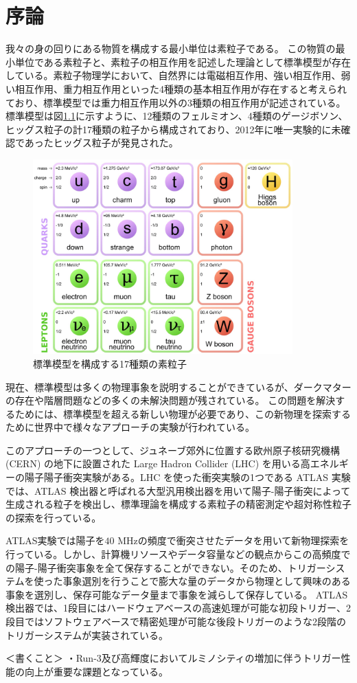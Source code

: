 \chapter{序論}
我々の身の回りにある物質を構成する最小単位は素粒子である。
この物質の最小単位である素粒子と、素粒子の相互作用を記述した理論として標準模型が存在している。素粒子物理学において、自然界には電磁相互作用、強い相互作用、弱い相互作用、重力相互作用といった4種類の基本相互作用が存在すると考えられており、標準模型では重力相互作用以外の3種類の相互作用が記述されている。
標準模型は図\ref{fig:標準模型}に示すように、12種類のフェルミオン、4種類のゲージボソン、ヒッグス粒子の計17種類の粒子から構成されており、2012年に唯一実験的に未確認であったヒッグス粒子が発見された。
\begin{figure}[tb]
  \centering
  \includegraphics[clip, width=10cm]{fig/1/standardmodel.jpg}
  \caption{標準模型を構成する17種類の素粒子}
  \label{fig:標準模型}
\end{figure}

現在、標準模型は多くの物理事象を説明することができているが、ダークマターの存在や階層問題などの多くの未解決問題が残されている。
この問題を解決するためには、標準模型を超える新しい物理が必要であり、この新物理を探索するために世界中で様々なアプローチの実験が行われている。

このアプローチの一つとして、ジュネーブ郊外に位置する欧州原子核研究機構 (CERN) の地下に設置された Large Hadron Collider (LHC) を用いる高エネルギーの陽子陽子衝突実験がある。LHC を使った衝突実験の1つである ATLAS 実験では、ATLAS 検出器と呼ばれる大型汎用検出器を用いて陽子-陽子衝突によって生成される粒子を検出し、標準理論を構成する素粒子の精密測定や超対称性粒子の探索を行っている。

ATLAS実験では陽子を$40$ MHzの頻度で衝突させたデータを用いて新物理探索を行っている。しかし、計算機リソースやデータ容量などの観点からこの高頻度での陽子-陽子衝突事象を全て保存することができない。そのため、トリガーシステムを使った事象選別を行うことで膨大な量のデータから物理として興味のある事象を選別し、保存可能なデータ量まで事象を減らして保存している。
ATLAS検出器では、1段目にはハードウェアベースの高速処理が可能な初段トリガー、2段目ではソフトウェアベースで精密処理が可能な後段トリガーのような2段階のトリガーシステムが実装されている。






＜書くこと＞
・Run-3及び高輝度においてルミノシティの増加に伴うトリガー性能の向上が重要な課題となっている。





